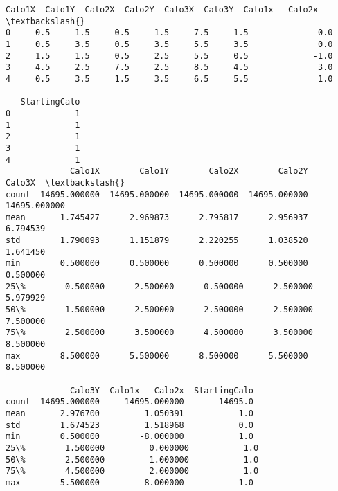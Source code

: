 \documentclass[11pt]{article}
\begin{document}
    \begin{Verbatim}[commandchars=\\\{\}]
   Calo1X  Calo1Y  Calo2X  Calo2Y  Calo3X  Calo3Y  Calo1x - Calo2x  \textbackslash{}
0     0.5     1.5     0.5     1.5     7.5     1.5              0.0   
1     0.5     3.5     0.5     3.5     5.5     3.5              0.0   
2     1.5     1.5     0.5     2.5     5.5     0.5             -1.0   
3     4.5     2.5     7.5     2.5     8.5     4.5              3.0   
4     0.5     3.5     1.5     3.5     6.5     5.5              1.0   

   StartingCalo  
0             1  
1             1  
2             1  
3             1  
4             1  
             Calo1X        Calo1Y        Calo2X        Calo2Y        Calo3X  \textbackslash{}
count  14695.000000  14695.000000  14695.000000  14695.000000  14695.000000   
mean       1.745427      2.969873      2.795817      2.956937      6.794539   
std        1.790093      1.151879      2.220255      1.038520      1.641450   
min        0.500000      0.500000      0.500000      0.500000      0.500000   
25\%        0.500000      2.500000      0.500000      2.500000      5.979929   
50\%        1.500000      2.500000      2.500000      2.500000      7.500000   
75\%        2.500000      3.500000      4.500000      3.500000      8.500000   
max        8.500000      5.500000      8.500000      5.500000      8.500000   

             Calo3Y  Calo1x - Calo2x  StartingCalo  
count  14695.000000     14695.000000       14695.0  
mean       2.976700         1.050391           1.0  
std        1.674523         1.518968           0.0  
min        0.500000        -8.000000           1.0  
25\%        1.500000         0.000000           1.0  
50\%        2.500000         1.000000           1.0  
75\%        4.500000         2.000000           1.0  
max        5.500000         8.000000           1.0  

    \end{Verbatim}
\end{document}
